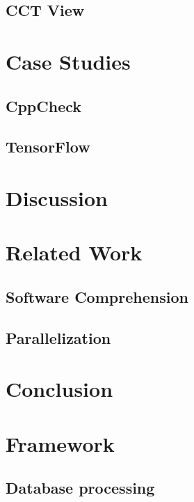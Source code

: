 \documentclass[conference]{IEEEtran}
\begin{document}
\subsection{CCT View}
\label{cct_view}

\section{Case Studies}
\label{sec:case_studies}

\subsection{CppCheck}
\label{sec:cppcheck}

\subsection{TensorFlow}
\label{sec:tensorflow}

\section{Discussion}
\label{sec:discussion}

\section{Related Work}
\label{sec:related_work}

\subsection{Software Comprehension}
\label{sec:software_comprehension}

\subsection{Parallelization}
\label{sec:related_work_parallelization}

\section{Conclusion}
\label{sec:conclusion}

\section{Framework}

\subsection{Database processing}
\label{dataprocessing}
\end{document}
